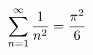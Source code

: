 \documentclass[preview]{standalone}
\begin{document}
\begin{align*}
\special{dvisvgm:raw <g id='unique000'>}\displaystyle\sum_{n=1}^{\infty}\dfrac{1}{n^2}=\dfrac{\pi^2}{6}\special{dvisvgm:raw </g>}
\end{align*}
\end{document}

